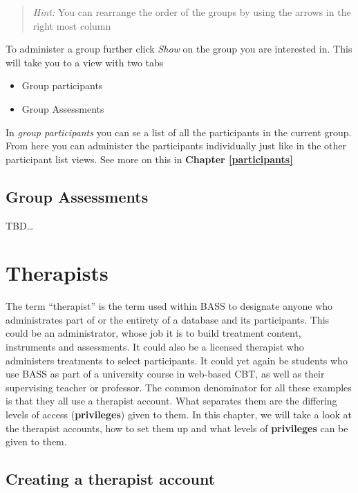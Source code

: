 \documentclass[
]{book}
\providecommand{\tightlist}{%
  \setlength{\itemsep}{0pt}\setlength{\parskip}{0pt}}
\begin{document}
\begin{quote}
\emph{Hint:} You can rearrange the order of the groups by using the arrows in the right most column
\end{quote}

To administer a group further click \emph{Show} on the group you are interested in. This will take you to a view with two tabs

\begin{itemize}
\tightlist
\item
  Group participants
\item
  Group Assessments
\end{itemize}

In \emph{group participants} you can se a list of all the participants in the current group. From here you can administer the participants individually just like in the other participant list views. See more on this in \textbf{Chapter \ref{participants}}

\section{Group Assessments}\label{groupassess}

TBD\ldots{}

\chapter{Therapists}\label{therapists}

The term ``therapist'' is the term used within BASS to designate anyone who administrates part of or the entirety of a database and its participants. This could be an administrator, whose job it is to build treatment content, instruments and assessments. It could also be a licensed therapist who administers treatments to select participants. It could yet again be students who use BASS as part of a university course in web-based CBT, as well as their supervising teacher or professor.
The common denominator for all these examples is that they all use a therapist account. What separates them are the differing levels of access (\textbf{privileges}) given to them. In this chapter, we will take a look at the therapist accounts, how to set them up and what levels of \textbf{privileges} can be given to them.

\section{Creating a therapist account}\label{creating-a-therapist-account}
\end{document}
